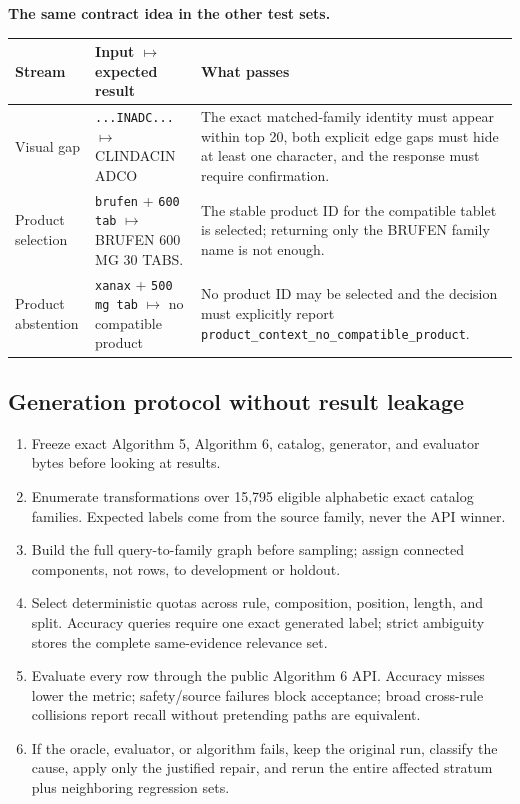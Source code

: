 \documentclass[10pt,a4paper]{article}
\newcommand{\observed}[1]{\texttt{#1}}
\begin{document}
\Needspace{.29\textheight}
\textbf{The same contract idea in the other test sets.}

\begin{tabularx}{\textwidth}{@{}L{28mm}L{52mm}Y@{}}
\toprule
Stream & Input $\mapsto$ expected result & What passes \\
\midrule
Visual gap & \observed{...INADC...} $\mapsto$ CLINDACIN ADCO & The exact matched-family identity must appear within top 20, both explicit edge gaps must hide at least one character, and the response must require confirmation. \\
Product selection & \observed{brufen} + \observed{600 tab} $\mapsto$ BRUFEN 600 MG 30 TABS. & The stable product ID for the compatible tablet is selected; returning only the BRUFEN family name is not enough. \\
Product abstention & \observed{xanax} + \observed{500 mg tab} $\mapsto$ no compatible product & No product ID may be selected and the decision must explicitly report \texttt{product\_context\_no\_compatible\_product}. \\
\bottomrule
\end{tabularx}


\subsection{Generation protocol without result leakage}

\begin{enumerate}
\item Freeze exact Algorithm 5, Algorithm 6, catalog, generator, and evaluator
bytes before looking at results.
\item Enumerate transformations over 15,795 eligible alphabetic exact catalog
families. Expected labels come from the source family, never the API winner.
\item Build the full query-to-family graph before sampling; assign connected
components, not rows, to development or holdout.
\item Select deterministic quotas across rule, composition, position, length,
and split. Accuracy queries require one exact generated label; strict ambiguity
stores the complete same-evidence relevance set.
\item Evaluate every row through the public Algorithm 6 API. Accuracy misses
lower the metric; safety/source failures block acceptance; broad cross-rule
collisions report recall without pretending paths are equivalent.
\item If the oracle, evaluator, or algorithm fails, keep the original run,
classify the cause, apply only the justified repair, and rerun the entire
affected stratum plus neighboring regression sets.
\end{enumerate}
\end{document}

